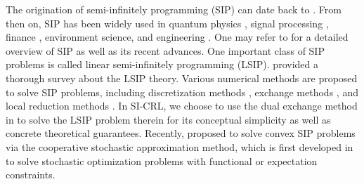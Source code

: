 The origination of semi-infinitely programming (SIP) can date back to \cite{remez1934determination}.
From then on, SIP has been widely used in quantum physics \citep{2021quantum}, signal processing \citep{moulin1997role, nordebo2001semi}, finance \citep{daum2011novel}, environment science, and engineering \citep{hettich1993semi}.
One may refer to \cite{hettich1993semi, goberna2018recent} for a detailed overview of SIP as well as its recent advances.
One important class of SIP problems is called linear semi-infinitely programming (LSIP).
\citet{GOBERNA2002390} provided a thorough survey about the LSIP theory.
Various numerical methods are proposed to solve SIP problems, including discretization methods \citep{still2001discretization, 2004discretization}, exchange methods \citep{Hu1990, 2010exchange}, and local reduction methods \citep{1970moment, coope1985projected}.
In SI-CRL, we choose to use the dual exchange method in \cite{Hu1990} to solve the LSIP problem therein for its conceptual simplicity as well as concrete theoretical guarantees.
Recently, \citet{wei2020comirror} proposed to solve convex SIP problems via the cooperative stochastic approximation method, which is first developed in \cite{lan2020algorithms} to solve stochastic optimization problems with functional or expectation constraints.




